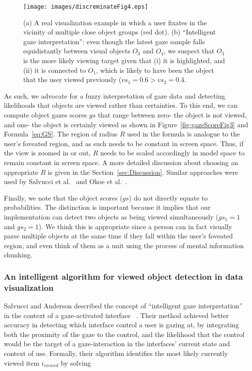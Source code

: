 \begin{figure}[htb]
  \centering
  \texttt{[image: images/discreminateFig4.eps]}
  \caption{(a) A real visualization example in which a user fixates in the vicinity of multiple close object groups (red dot). (b) ``Intelligent gaze interpretation'': even though the latest gaze sample falls equidistantly between visual objects $O_3$ and $O_4$, we suspect that $O_3$ is the more likely viewing target given that (i) it is highlighted, and (ii) it is connected to $O_1$, which is likely to have been the object that the user viewed previously ($vs_1=0.6 > vs_2 = 0.4$. }
	\label{fig:discreminateFig4}
\end{figure}

As such, we advocate for a fuzzy interpretation of gaze data and detecting likelihoods that objects are viewed rather than certainties. To this end, we can compute object gazes scores $gs$ that range between zero- the object is not viewed, and one- the object is certainly viewed as shown in Figure~\ref{fig:gazeScoreFig3} and Formula~\ref{eq:GS}. The region of radius $R$ used in the formula is analogue to the user's foveated region, and as such needs to be constant in screen space. Thus, if the view is zoomed in or out, $R$ needs to be scaled accordingly in model space to remain constant in screen space.  A more detailed discussion about choosing an appropriate $R$ is given in the Section~\ref{sec:Discussion}. Similar approaches were used by Salvucci et al.~\cite{salvucci2000intelligent} and Okoe et al.~\cite{okoe2014gaze}.

Finally, we note that the object scores ($gs$) do not directly equate to probabilities. The distinction is important because it implies that our implementation can detect two objects as being viewed simultaneously ($gs_1 = 1$ and $gs_2=1$). We think this is appropriate since a person can in fact visually parse multiple objects at the same time if they fall within the user's foveated region, and even think of them as a unit using the process of mental information chunking.

\subsubsection{An intelligent algorithm for viewed object detection in data visualization}
\label{sec:MehthodsIntelligentAlgorithm}
Salvucci and Anderson described the concept of ``intelligent gaze interpretation'' in the context of a gaze-activated interface ~\cite{salvucci2000intelligent}. Their method achieved better accuracy in detecting which interface control a user is gazing at, by integrating both the proximity of the gaze to the control, and the likelihood that the control would be the target of a gaze-interaction in the interfaces' current state and context of use. Formally, their algorithm identifies the most likely currently viewed item $i_{viewed}$ by solving 

